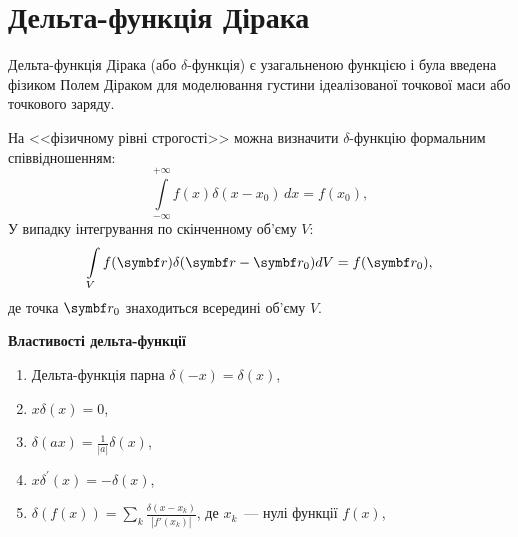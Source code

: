 \section{Дельта-функція Дірака}\setcounter{equation}{0}

Дельта-функція Дірака (або $\delta$-функція) є узагальненою функцією і була введена фізиком Полем Діраком для моделювання густини ідеалізованої точкової маси або точкового заряду.

На <<фізичному рівні строгості>> можна визначити $\delta$-функцію формальним співвідношенням: 
\begin{equation}
    \int\limits_{-\infty}^{+\infty}f(x)\delta(x-x_0)\,dx=f(x_0),
\end{equation}
У випадку інтегрування по скінченному об'єму $V$:
\begin{equation}\label{eq:delta3D}
    \int\limits_{V}f(\vect{r})\delta(\vect{r} - \vect{r}_0) dV=f(\vect{r}_0),
\end{equation} 
де точка $\vect{r}_0$ знаходиться всередині об'єму $V$.

%
\bigskip\noindent%
\textbf{Властивості дельта-функції}
\bigskip

\begin{enumerate}[label=\alph*)]
\item Дельта-функція парна $\delta(-x) = \delta(x)$,
\item $x\delta(x) = 0$,
\item $\delta(ax) = \frac{1}{|a|}\delta(x)$,
\item  $x\delta^\prime(x)=-\delta(x)$,
\item $\delta(f(x))=\sum\limits_k\frac{\delta(x-x_k)}{|f'(x_k)|}$, де $x_k$~--- нулі функції $f(x)$,

\end{enumerate}

